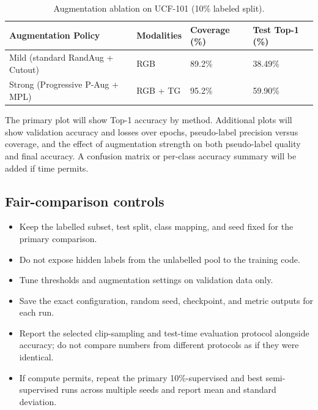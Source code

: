 \documentclass[11pt,a4paper]{article}
\begin{document}
\begin{table}[H]
\centering
\small
\caption{Augmentation ablation on UCF-101 (10\% labeled split).}
\begin{tabularx}{\textwidth}{L{3.5cm}L{3.0cm}L{2.5cm}Y}
\toprule
\textbf{Augmentation Policy} & \textbf{Modalities} & \textbf{Coverage (\%)} & \textbf{Test Top-1 (\%)} \\
\midrule
Mild (standard RandAug + Cutout) & RGB & 89.2\% & 38.49\% \\
Strong (Progressive P-Aug + MPL) & RGB + TG & 95.2\% & 59.90\% \\
\bottomrule
\end{tabularx}
\end{table}


The primary plot will show Top-1 accuracy by method. Additional plots will show validation accuracy and losses over epochs, pseudo-label precision versus coverage, and the effect of augmentation strength on both pseudo-label quality and final accuracy. A confusion matrix or per-class accuracy summary will be added if time permits.

\subsection{Fair-comparison controls}
\begin{itemize}
  \item Keep the labelled subset, test split, class mapping, and seed fixed for the primary comparison.
  \item Do not expose hidden labels from the unlabelled pool to the training code.
  \item Tune thresholds and augmentation settings on validation data only.
  \item Save the exact configuration, random seed, checkpoint, and metric outputs for each run.
  \item Report the selected clip-sampling and test-time evaluation protocol alongside accuracy; do not compare numbers from different protocols as if they were identical.
  \item If compute permits, repeat the primary 10\%-supervised and best semi-supervised runs across multiple seeds and report mean and standard deviation.
\end{itemize}

\end{document}
